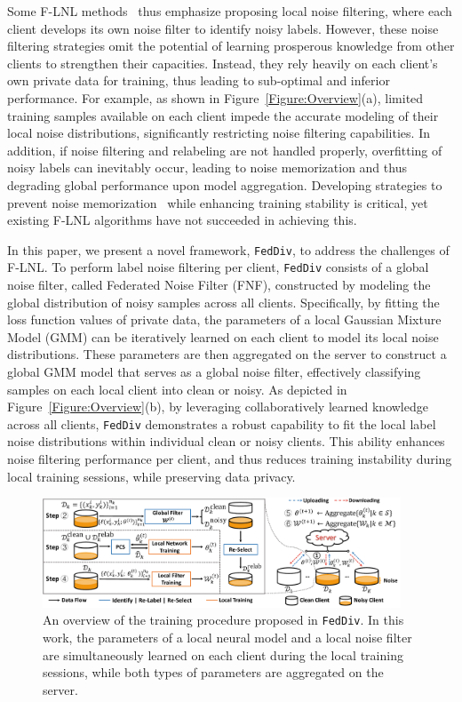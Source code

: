 \documentclass[letterpaper]{article} %
\begin{document}
Some F-LNL methods~\cite{kim2022fedrn,xu2022fedcorr} thus emphasize proposing local noise filtering, where each client develops its own noise filter to identify noisy labels. However, these noise filtering strategies omit the potential of learning prosperous knowledge from other clients to strengthen their capacities. Instead, they rely heavily on each client’s own private data for training, thus leading to sub-optimal and inferior performance. For example, as shown in Figure~\ref{Figure:Overview}(a), limited training samples available on each client impede the accurate modeling of their local noise distributions, significantly restricting noise filtering capabilities. In addition, if noise filtering and relabeling are not handled properly, overfitting of noisy labels can inevitably occur, leading to noise memorization and thus degrading global performance upon model aggregation. Developing strategies to prevent noise memorization~\cite{noisememory6} while enhancing training stability is critical, yet existing F-LNL algorithms have not succeeded in achieving this.

In this paper, we present a novel framework, \texttt{FedDiv}, to address the challenges of F-LNL. To perform label noise filtering per client, \texttt{FedDiv} consists of a global noise filter, called Federated Noise Filter (FNF), constructed by modeling the global distribution of noisy samples across all clients. Specifically, by fitting the loss function values of private data, the parameters of a local Gaussian Mixture Model (GMM) can be iteratively learned on each client to model its local noise distributions. These parameters are then aggregated on the server to construct a global GMM model that serves as a global noise filter, effectively classifying samples on each local client into clean or noisy. As depicted in Figure~\ref{Figure:Overview}(b), by leveraging collaboratively learned knowledge across all clients, \texttt{FedDiv} demonstrates a robust capability to fit the local label noise distributions within individual clean or noisy clients. This ability enhances noise filtering performance per client, and thus reduces training instability during local training sessions, while preserving data privacy.

\begin{figure}[t]
    \centering
    \includegraphics[width=0.95\textwidth]{figures/framework.pdf}

    \caption{An overview of the training procedure proposed in \texttt{FedDiv}.
    In this work, the parameters of a local neural model and a local noise filter are simultaneously learned on each client during the local training sessions, while both types of parameters are aggregated on the server.}
    \label{Figure:Framework}

\end{figure}
\end{document}
